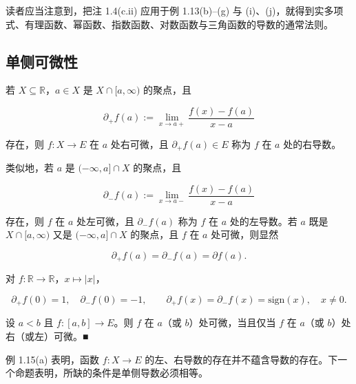 \begin{remark}

读者应当注意到，把注 1.4(c.ii) 应用于例 1.13(b)–(g) 与 (i)、(j)，就得到实多项式、有理函数、幂函数、指数函数、对数函数与三角函数的导数的通常法则。

\end{remark}

\subsection*{单侧可微性}

若 $ X \subseteq \mathbb{R} $，$ a \in X $ 是 $ X \cap [a, \infty) $ 的聚点，且

\[
\partial_{+}f(a):=\lim_{x\to a+}\frac{f(x)-f(a)}{x-a}
\]

存在，则 $f: X \to E$ 在 $a$ 处右可微，且 $\partial_{+}f(a) \in E$ 称为 $f$ 在 $a$ 处的右导数。

类似地，若 $a$ 是 $(-\infty, a] \cap X$ 的聚点，且

\[
\partial_{-}f(a):=\lim_{x\to a-}\frac{f(x)-f(a)}{x-a}
\]

存在，则 $f$ 在 $a$ 处左可微，且 $\partial_{-}f(a)$ 称为 $f$ 在 $a$ 处的左导数。若 $a$ 既是 $X \cap [a, \infty)$ 又是 $(-\infty, a] \cap X$ 的聚点，且 $f$ 在 $a$ 处可微，则显然

\[
\partial_{+}f(a)=\partial_{-}f(a)=\partial f(a).
\]

\begin{example}

\begin{items}
\item

对 $ f: \mathbb{R} \to \mathbb{R} $，$ x \mapsto |x| $，

\[
\partial_{+}f(0)=1,\quad\partial_{-}f(0)=-1,\qquad\partial_{+}f(x)=\partial_{-}f(x)=\mathrm{s i g n}(x),\quad x\neq0.
\]
\item

设 $a < b$ 且 $f: [a, b] \to E$。则 $f$ 在 $a$（或 $b$）处可微，当且仅当 $f$ 在 $a$（或 $b$）处右（或左）可微。■

\end{items}

例 1.15(a) 表明，函数 $f: X \to E$ 的左、右导数的存在并不蕴含导数的存在。下一个命题表明，所缺的条件是单侧导数必须相等。

\end{example}

